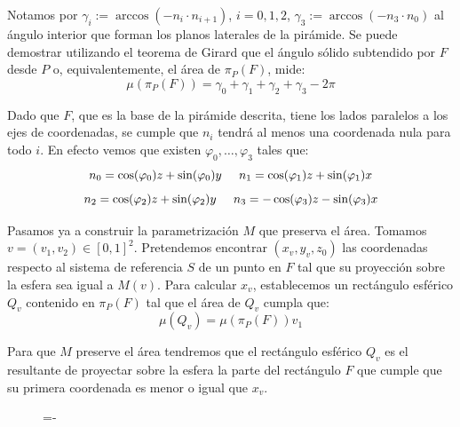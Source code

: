 Notamos por $\gamma_i := \arccos(-n_i\cdot n_{i+1})$, $i=0,1,2$, $\gamma_3 := \arccos(-n_3\cdot n_0)$ al ángulo interior que forman los planos laterales de la pirámide. Se puede demostrar utilizando el teorema de Girard que el ángulo sólido subtendido por $F$ desde $P$ o, equivalentemente, el área de $\pi_P(F)$, mide:
$$\mu(\pi_P(F)) = \gamma_0 +\gamma_1 + \gamma_2 + \gamma_3 - 2\pi $$

Dado que $F$, que es la base de la pirámide descrita, tiene los lados paralelos a los ejes de coordenadas, se cumple que $n_i$ tendrá al menos una coordenada nula para todo $i$. En efecto vemos que existen $\varphi_0,\ldots,\varphi_3$ tales que:
$$ n_0 = \cos(\varphi_0)z + \sin(\varphi_0)y\hspace{0.5cm}n_1 = \cos(\varphi_1)z + \sin(\varphi_1)x$$
$$ n_2 = \cos(\varphi_2)z + \sin(\varphi_2)y\hspace{0.5cm}n_3 = -\cos(\varphi_3)z - \sin(\varphi_3)x$$

Pasamos ya a construir la parametrización $M$ que preserva el área. Tomamos $v=(v_1,v_2)\in [0,1]^2$. Pretendemos encontrar $(x_v,y_v,z_0)$ las coordenadas respecto al sistema de referencia $S$ de un punto en $F$ tal que su proyección sobre la esfera sea igual a $M(v)$. Para calcular $x_v$, establecemos un rectángulo esférico $Q_v$ contenido en $\pi_P(F)$ tal que el área de $Q_v$ cumpla que:
$$\mu(Q_v) = \mu(\pi_P(F)) v_1 $$

Para que $M$ preserve el área tendremos que el rectángulo esférico $Q_v$ es el resultante de proyectar sobre la esfera la parte del rectángulo $F$ que cumple que su primera coordenada es menor o igual que $x_v$. 

\begin{figure}[h]
  \lineskip=-\fboxrule
\end{figure}


